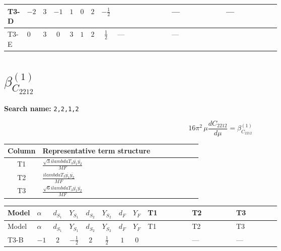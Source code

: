 \documentclass[8pt]{article}
\begin{document}
\begin{landscape}
\begin{longtable}{@{}llcccccc >{\raggedright\arraybackslash}p{0.21\linewidth} >{\raggedright\arraybackslash}p{0.21\linewidth} >{\raggedright\arraybackslash}p{0.21\linewidth}@{}}
\midrule
T3-D & $-2$ & $3$ & $-1$ & $1$ & $0$ & $2$ & $-\frac{1}{2}$ & \scriptsize\adjustbox{max width=\linewidth}{$\begin{gathered} \frac{2 \sqrt{3} lambdaT_{3} \overline{y_{1}} \overline{y_{2}}}{3 MF}\end{gathered}$} & --- & --- \\
\midrule
T3-E & $0$ & $3$ & $0$ & $3$ & $1$ & $2$ & $\frac{1}{2}$ & --- & --- & \scriptsize\adjustbox{max width=\linewidth}{$\begin{gathered} - \frac{2 \sqrt{6} lambdaT_{3} \overline{y_{1}} \overline{y_{2}}}{3 MF}\end{gathered}$} \\
\midrule
\bottomrule
\end{longtable}
\clearpage
\section*{$\beta_{C_{2212}}^{(1)}$}
\noindent\textbf{Search name: }\texttt{2,2,1,2}\par\smallskip
\[16\pi^2\,\mu\frac{d C_{2212}}{d\mu}=\beta_{C_{2212}}^{(1)}\]
\begin{center}
\begin{tabular}{@{}c >{\raggedright\arraybackslash}p{0.82\linewidth}@{}}
\toprule
Column & Representative term structure \\
\midrule
T1 & \(\displaystyle \frac{\sqrt{3} i lambdaT_{3} \overline{y_{1}} \overline{y_{2}}}{MF}\) \\
\midrule
T2 & \(\displaystyle \frac{i lambdaT_{3} \overline{y_{1}} \overline{y_{2}}}{MF}\) \\
\midrule
T3 & \(\displaystyle \frac{\sqrt{6} i lambdaT_{3} \overline{y_{1}} \overline{y_{2}}}{MF}\) \\
\midrule
\bottomrule
\end{tabular}
\end{center}
\smallskip
\tiny
\begin{longtable}{@{}llcccccc >{\raggedright\arraybackslash}p{0.21\linewidth} >{\raggedright\arraybackslash}p{0.21\linewidth} >{\raggedright\arraybackslash}p{0.21\linewidth}@{}}
\toprule
Model & $\alpha$ & $d_{S_1}$ & $Y_{S_1}$ & $d_{S_2}$ & $Y_{S_2}$ & $d_F$ & $Y_F$ & T1 & T2 & T3 \\
\midrule
\endfirsthead
\toprule
Model & $\alpha$ & $d_{S_1}$ & $Y_{S_1}$ & $d_{S_2}$ & $Y_{S_2}$ & $d_F$ & $Y_F$ & T1 & T2 & T3 \\
\midrule
\endhead
T3-B & $-1$ & $2$ & $-\frac{1}{2}$ & $2$ & $\frac{1}{2}$ & $1$ & $0$ & \scriptsize\adjustbox{max width=\linewidth}{$\begin{gathered} \frac{2 \sqrt{3} i lambdaT_{3} \overline{y_{1}} \overline{y_{2}}}{3 MF}\end{gathered}$} & --- & --- \\

\end{longtable}
\end{landscape}
\end{document}
